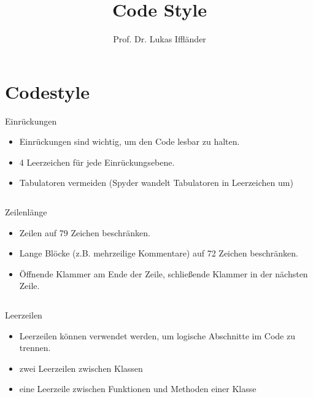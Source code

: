\documentclass[xelatex,aspectratio=169]{beamer}
\title{Code Style}
\author{Prof. Dr. Lukas Iffländer}
\institute{HTW Dresden}
\date{}
\begin{document}
\begin{frame}
    \titlepage
\end{frame}

\section{Codestyle}

\begin{frame}{Einrückungen}
    \begin{itemize}
        \item Einrückungen sind wichtig, um den Code lesbar zu halten.
        \item 4 Leerzeichen für jede Einrückungsebene.
        \item Tabulatoren vermeiden (Spyder wandelt Tabulatoren in Leerzeichen um)
    \end{itemize}
    \inputminted{python}{src/style_indentation.py}

\end{frame}

\begin{frame}{Zeilenlänge}
    \begin{itemize}
        \item Zeilen auf 79 Zeichen beschränken.
        \item Lange Blöcke (z.B. mehrzeilige Kommentare) auf 72 Zeichen beschränken.
        \item Öffnende Klammer am Ende der Zeile, schließende Klammer in der nächsten Zeile.
    \end{itemize}
    \inputminted[firstline=14]{python}{src/style_length.py}
\end{frame}

\begin{frame}{Leerzeilen}
    \begin{itemize}
        \item Leerzeilen können verwendet werden, um logische Abschnitte im Code zu trennen.
        \item zwei Leerzeilen zwischen Klassen
        \item eine Leerzeile zwischen Funktionen und Methoden einer Klasse
    \end{itemize}
    \inputminted{python}{src/style_blank_lines.py}
\end{frame}
\end{document}
